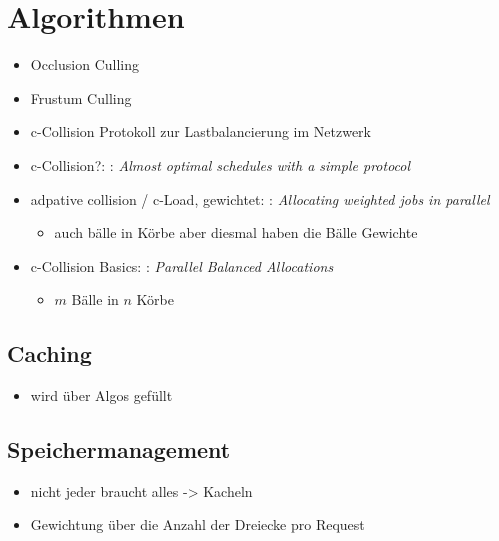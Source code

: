 \section{Algorithmen}
\label{sec:basics:algorithmen}
\begin{itemize}
 \item Occlusion Culling \cite{RTR3}
 \item Frustum Culling \cite{RTR3}
 \item c-Collision Protokoll zur Lastbalancierung im Netzwerk
 \item c-Collision?: \cite{DBLP:conf/arcs/RehbergS99}: \textit{Almost optimal schedules with a simple protocol}
 \item adpative collision / c-Load, gewichtet: \cite{ccol2}: \textit{Allocating weighted jobs in parallel}
 \begin{itemize}
  \item auch bälle in Körbe aber diesmal haben die Bälle Gewichte
 \end{itemize}

 \item c-Collision Basics: \cite{ccol3}: \textit{Parallel Balanced Allocations}
 \begin{itemize}
  \item $m$ Bälle in $n$ Körbe
 \end{itemize}
\end{itemize}

\subsection{Caching}
\label{sec:basics:caching}
\begin{itemize}
 \item wird über Algos gefüllt
\end{itemize}

\subsection{Speichermanagement}
\label{sec:basics:speichermanagement}
\begin{itemize}
 \item nicht jeder braucht alles -> Kacheln
 \item Gewichtung über die Anzahl der Dreiecke pro Request
\end{itemize}
